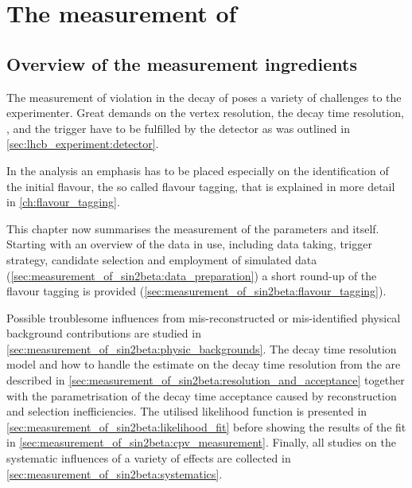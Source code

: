 
\chapter[
  head={The measurement of \sintwobeta},
  tocentry={The measurement of \sintwobetabfsfHyperref}
]
{The measurement of \sintwobetabfsf}
\label{ch:measurement_of_sin2beta}

\section{Overview of the measurement ingredients}
\label{sec:measurement_of_sin2beta:overview}

The measurement of \CP violation in the decay of \BdToJpsiKS poses a variety of
challenges to the experimenter. Great demands on the vertex resolution, the
decay time resolution, \PID, and the trigger have to be fulfilled by the \LHCb
detector as was outlined in \cref{sec:lhcb_experiment:detector}.

In the analysis an emphasis has to be placed especially on the identification of
the initial \Bmeson flavour, the so called flavour tagging, that is explained in
more detail in \cref{ch:flavour_tagging}.

This chapter now summarises the measurement of the \CP parameters \SJpsiKS and
\CJpsiKS itself. Starting with an overview of the data in use, including data
taking, trigger strategy, candidate selection and employment of simulated data
(\cref{sec:measurement_of_sin2beta:data_preparation}) a short round-up of the
flavour tagging is provided (\cref{sec:measurement_of_sin2beta:flavour_tagging}). 

Possible troublesome influences from mis-reconstructed or mis-identified
physical background contributions are studied in
\cref{sec:measurement_of_sin2beta:physic_backgrounds}. The decay time resolution
model and how to handle the estimate on the decay time resolution from the \DTF
are described in
\cref{sec:measurement_of_sin2beta:resolution_and_acceptance} together with
the parametrisation of the decay time acceptance caused by reconstruction and
selection inefficiencies. The utilised likelihood function is presented in
\cref{sec:measurement_of_sin2beta:likelihood_fit} before showing the results of
the fit in \cref{sec:measurement_of_sin2beta:cpv_measurement}. Finally, all
studies on the systematic influences of a variety of effects are collected in
\cref{sec:measurement_of_sin2beta:systematics}.

